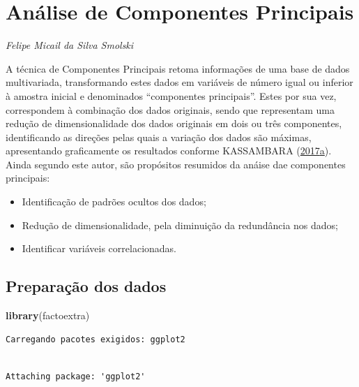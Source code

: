 \documentclass[12pt,brazil,oneside]{book}
\newenvironment{Shaded}{\begin{snugshade}}{\end{snugshade}}
\newcommand{\KeywordTok}[1]{\textcolor[rgb]{0.13,0.29,0.53}{\textbf{#1}}}
\newcommand{\NormalTok}[1]{#1}
\providecommand{\tightlist}{%
  \setlength{\itemsep}{0pt}\setlength{\parskip}{0pt}}
\begin{document}
\hypertarget{analise-de-componentes-principais-1}{%
\chapter{Análise de Componentes Principais}\label{analise-de-componentes-principais-1}}

\emph{Felipe Micail da Silva Smolski}

\begin{flushright}
\emph{}
\end{flushright}

A técnica de Componentes Principais retoma informações de uma base de dados multivariada, transformando estes dados em variáveis de número igual ou inferior à amostra inicial e denominados ``componentes principais''. Estes por sua vez, correspondem à combinação dos dados originais, sendo que representam uma redução de dimensionalidade dos dados originais em dois ou três componentes, identificando as direções pelas quais a variação dos dados são máximas, apresentando graficamente os resultados conforme KASSAMBARA (\protect\hyperlink{ref-Kassambara2017b}{2017}\protect\hyperlink{ref-Kassambara2017b}{a}). Ainda segundo este autor, são propósitos resumidos da anáise dae componentes principais:

\begin{itemize}
\tightlist
\item
  Identificação de padrões ocultos dos dados;
\item
  Redução de dimensionalidade, pela diminuição da redundância nos dados;
\item
  Identificar variáveis correlacionadas.
\end{itemize}

\hypertarget{preparacao-dos-dados}{%
\section{Preparação dos dados}\label{preparacao-dos-dados}}

\begin{Shaded}
\begin{Highlighting}[]
\KeywordTok{library}\NormalTok{(factoextra)}
\end{Highlighting}
\end{Shaded}

\begin{verbatim}
Carregando pacotes exigidos: ggplot2
\end{verbatim}

\begin{verbatim}

Attaching package: 'ggplot2'
\end{verbatim}
\end{document}
